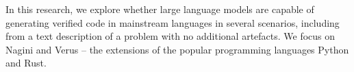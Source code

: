 
In this research, we explore whether large language models are capable of generating verified code in mainstream languages in several scenarios, including from a text description of a problem with no additional artefacts. 
We focus on Nagini and Verus -- the extensions of the popular programming languages Python and Rust. 
